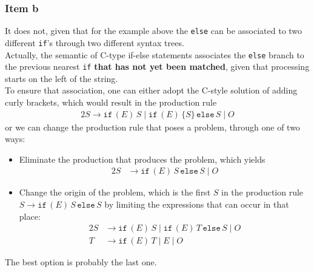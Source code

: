\documentclass[docid=CA07]{tcom_CA}
\begin{document}
{\subsubsection{Item b}
It does not, given that for the example above the \texttt{else} can be associated to two different \texttt{if}'s through two different syntax trees.\\
Actually, the semantic of C-type if-else statements associates the \texttt{else} branch to the previous nearest \texttt{if} \textbf{that has not yet been matched}, given that processing starts on the left of the string.\\
To ensure that association, one can either adopt the C-style solution of adding curly brackets, which would result in the production rule
\begin{alignat*}{2}
	S \rightarrow \mathtt{if}\,(E)\,S\mid \mathtt{if}\,(E)\,\{S\}\,\mathtt{else}\,S\mid O
\end{alignat*}
or we can change the production rule that poses a problem, through one of two ways:
\begin{itemize}
	\item Eliminate the production that produces the problem, which yields
	\begin{alignat*}{2}
		S &\rightarrow \mathtt{if}\,(E)\,S\,\mathtt{else}\,S\mid O
	\end{alignat*}
	\item Change the origin of the problem, which is the first $S$ in the production rule $S \rightarrow \mathtt{if}\,(E)\,S\,\mathtt{else}\,S$ by limiting the expressions that can occur in that place:
	\begin{alignat*}{2}
		S &\rightarrow \mathtt{if}\,(E)\,S\mid \mathtt{if}\,(E)\,T\,\mathtt{else}\,S\mid O\\
		T &\rightarrow \mathtt{if}\,(E)\,T\mid E \mid  O 
	\end{alignat*}
\end{itemize}
The best option is probably the last one.
}
\end{document}
